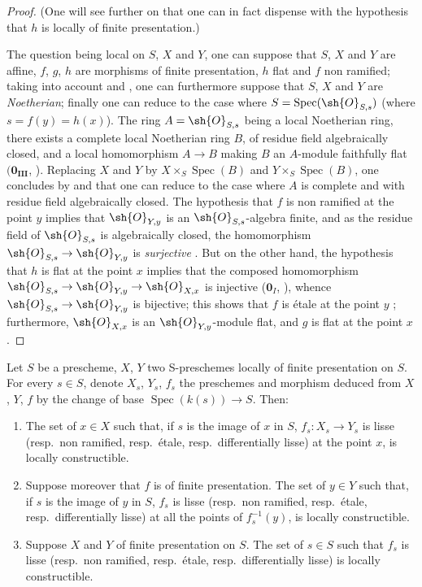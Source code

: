 \begin{proof}
(One will see further on  that one can in fact dispense with the hypothesis that $h$ is locally of finite presentation.)

The question being local on $S$, $X$ and $Y$, one can suppose that $S$, $X$ and $Y$ are affine, $f$, $g$, $h$ are morphisms of finite presentation, $h$ flat and $f$ non ramified; taking into account  and , one can furthermore suppose that $S$, $X$ and $Y$ are \emph{Noetherian}; finally one can reduce to the case where $S=\operatorname{Spec}(\sh{O}_{S,s})$ (where $s=f(y)=h(x)$).
The ring $A=\sh{O}_{S,s}$ being a local Noetherian ring, there exists a complete local Noetherian ring $B$, of residue field algebraically closed, and a local homomorphism $A\to B$ making $B$ an $A$-module faithfully flat $(\mathbf{0_{III}}$, ).
Replacing $X$ and $Y$ by $X\times_S\operatorname{Spec}(B)$ and $Y\times_S\operatorname{Spec}(B)$, one concludes by  and  that one can reduce to the case where $A$ is complete and with residue field algebraically closed.
The hypothesis that $f$ is non ramified at the point $y$ implies  that $\sh{O}_{Y,y}$ is an $\sh{O}_{S,s}$-algebra finite, and as the residue field of $\sh{O}_{S,s}$ is algebraically closed, the homomorphism $\sh{O}_{S,s}\to\sh{O}_{Y,y}$ is \emph{surjective} .
But on the other hand, the hypothesis that $h$ is flat at the point $x$ implies that the composed homomorphism $\sh{O}_{S,s}\to\sh{O}_{Y,y}\to\sh{O}_{X,x}$ is injective ($\mathbf{0}_I$, ), whence $\sh{O}_{S,s}\to\sh{O}_{Y,y}$ is bijective; this shows that $f$ is \'etale at the point $y$ ; furthermore, $\sh{O}_{X,x}$ is an $\sh{O}_{Y,y}$-module flat, and $g$ is flat at the point $x$.
\end{proof}

\begin{proposition}[17.7.11]
\label{IV.17.7.11}
Let $S$ be a prescheme, $X$, $Y$ two S-preschemes locally of finite presentation on $S$.
For every $s\in S$, denote $X_s$, $Y_s$, $f_s$ the preschemes and morphism deduced from $X$, $Y$, $f$ by the change of base $\operatorname{Spec}(k(s))\to S$.
Then:
\begin{enumerate}[label=(\roman*)]
  \item The set of $x\in X$ such that, if $s$ is the image of $x$ in $S$, $f_s:X_s\to Y_s$ is lisse (resp.\ non ramified, resp.\ \'etale, resp.\ differentially lisse) at the point $x$, is locally constructible.
  \item Suppose moreover that $f$ is of finite presentation.
  The set of $y\in Y$ such that, if $s$ is the image of $y$ in $S$, $f_s$ is lisse (resp.\ non ramified, resp.\ \'etale, resp.\ differentially lisse) at all the points of $f_s^{-1}(y)$, is locally constructible.
  \item Suppose $X$ and $Y$ of finite presentation on $S$.
  The set of $s\in S$ such that $f_s$ is lisse (resp.\ non ramified, resp.\ \'etale, resp.\ differentially lisse) is locally constructible.
\end{enumerate}
\end{proposition}

